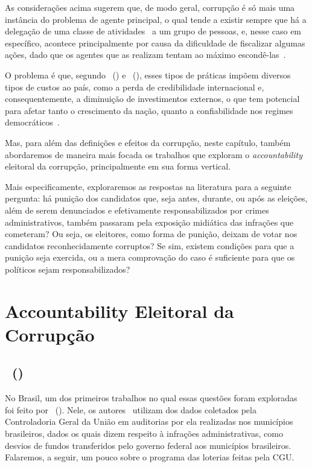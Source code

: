 \documentclass[
	12pt,				%
	openright,			%
	twoside,			%
	a4paper,			%
	openany,
	english,			%
	brazil				%
	]{abntex2}
\begin{document}
As considerações acima sugerem que, de modo geral, corrupção é só mais uma instância do problema de agente principal, o qual tende a existir sempre que há a delegação de uma classe de atividades~\cite{Rose-Ackerman1978} a um grupo de pessoas, e, nesse caso em específico, acontece principalmente por causa da dificuldade de fiscalizar algumas ações, dado que os agentes que as realizam tentam ao máximo escondê-las~\cite{Treisman2000Jun, Rose-Ackerman1996Sep}.

O problema é que, segundo ~(\citeyear{Rose-Ackerman1996Sep}) e ~(\citeyear{Kunicova2005Oct}), esses tipos de práticas impõem diversos tipos de custos ao país, como a perda de credibilidade internacional e, consequentemente, a diminuição de investimentos externos, o que tem potencial para afetar tanto o crescimento da nação, quanto a confiabilidade nos regimes democráticos~\cite{Boas2019Apr}.

Mas, para além das definições e efeitos da corrupção, neste capítulo, também abordaremos de maneira mais focada os trabalhos que exploram o \textit{accountability} eleitoral da corrupção, principalmente em sua forma vertical.

Mais especificamente, exploraremos as respostas na literatura para a seguinte pergunta: há punição dos candidatos que, seja antes, durante, ou após as eleições, além de serem denunciados e efetivamente responsabilizados por crimes administrativos, também passaram pela exposição midiática das infrações que cometeram? Ou seja, os eleitores, como forma de punição, deixam de votar nos candidatos reconhecidamente corruptos? Se sim, existem condições para que a punição seja exercida, ou a mera comprovação do caso é suficiente para que os políticos sejam responsabilizados?

\section{Accountability Eleitoral da Corrupção}


\subsection{~(\citeyear{ferraz2008exposing})}
No Brasil, um dos primeiros trabalhos no qual essas questões foram exploradas foi feito por ~(\citeyear{ferraz2008exposing}). Nele, os autores~\cite{ferraz2008exposing} utilizam dos dados coletados pela Controladoria Geral da União em auditorias por ela realizadas nos municípios brasileiros, dados os quais dizem respeito à infrações administrativas, como desvios de fundos transferidos pelo governo federal aos municípios brasileiros. Falaremos, a seguir, um pouco sobre o programa das loterias feitas pela CGU.
\end{document}
